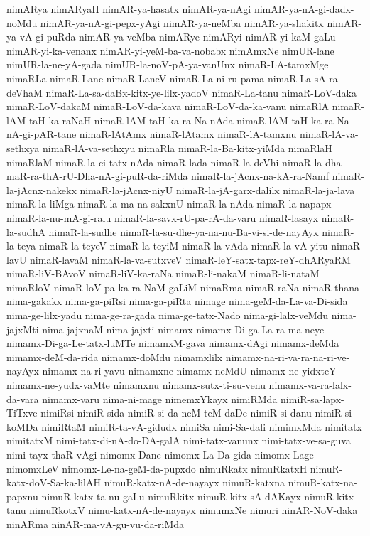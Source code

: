 {nimARya
nimARyaH
nimAR-ya-hasatx
nimAR-ya-nAgi
nimAR-ya-nA-gi-dadx-noMdu
nimAR-ya-nA-gi-pepx-yAgi
nimAR-ya-neMba
nimAR-ya-shakitx
nimAR-ya-vA-gi-puRda
nimAR-ya-veMba
nimARye
nimARyi
nimAR-yi-kaM-gaLu
nimAR-yi-ka-venanx
nimAR-yi-yeM-ba-va-nobabx
nimAmxNe
nimUR-lane
nimUR-la-ne-yA-gada
nimUR-la-noV-pA-ya-vanUnx
nimaR-LA-tamxMge
nimaRLa
nimaR-Lane
nimaR-LaneV
nimaR-La-ni-ru-pama
nimaR-La-sA-ra-deVhaM
nimaR-La-sa-daBx-kitx-ye-lilx-yadoV
nimaR-La-tanu
nimaR-LoV-daka
nimaR-LoV-dakaM
nimaR-LoV-da-kava
nimaR-LoV-da-ka-vanu
nimaRlA
nimaR-lAM-taH-ka-raNaH
nimaR-lAM-taH-ka-ra-Na-nAda
nimaR-lAM-taH-ka-ra-Na-nA-gi-pAR-tane
nimaR-lAtAmx
nimaR-lAtamx
nimaR-lA-tamxnu
nimaR-lA-va-sethxya
nimaR-lA-va-sethxyu
nimaRla
nimaR-la-Ba-kitx-yiMda
nimaRlaH
nimaRlaM
nimaR-la-ci-tatx-nAda
nimaR-lada
nimaR-la-deVhi
nimaR-la-dha-maR-ra-thA-rU-Dha-nA-gi-puR-da-riMda
nimaR-la-jAcnx-na-kA-ra-Namf
nimaR-la-jAcnx-nakekx
nimaR-la-jAcnx-niyU
nimaR-la-jA-garx-dalilx
nimaR-la-ja-lava
nimaR-la-liMga
nimaR-la-ma-na-sakxnU
nimaR-la-nAda
nimaR-la-napapx
nimaR-la-nu-mA-gi-ralu
nimaR-la-savx-rU-pa-rA-da-varu
nimaR-lasayx
nimaR-la-sudhA
nimaR-la-sudhe
nimaR-la-su-dhe-ya-na-nu-Ba-vi-si-de-nayAyx
nimaR-la-teya
nimaR-la-teyeV
nimaR-la-teyiM
nimaR-la-vAda
nimaR-la-vA-yitu
nimaR-lavU
nimaR-lavaM
nimaR-la-va-sutxveV
nimaR-leY-satx-tapx-reY-dhARyaRM
nimaR-liV-BAvoV
nimaR-liV-ka-raNa
nimaR-li-nakaM
nimaR-li-nataM
nimaRloV
nimaR-loV-pa-ka-ra-NaM-gaLiM
nimaRma
nimaR-raNa
nimaR-thana
nima-gakakx
nima-ga-piRsi
nima-ga-piRta
nimage
nima-geM-da-La-va-Di-sida
nima-ge-lilx-yadu
nima-ge-ra-gada
nima-ge-tatx-Nado
nima-gi-lalx-veMdu
nima-jajxMti
nima-jajxnaM
nima-jajxti
nimamx
nimamx-Di-ga-La-ra-ma-neye
nimamx-Di-ga-Le-tatx-luMTe
nimamxM-gava
nimamx-dAgi
nimamx-deMda
nimamx-deM-da-rida
nimamx-doMdu
nimamxlilx
nimamx-na-ri-va-ra-na-ri-ve-nayAyx
nimamx-na-ri-yavu
nimamxne
nimamx-neMdU
nimamx-ne-yidxteY
nimamx-ne-yudx-vaMte
nimamxnu
nimamx-sutx-ti-su-venu
nimamx-va-ra-lalx-da-vara
nimamx-varu
nima-ni-mage
nimemxYkayx
nimiRMda
nimiR-sa-lapx-TiTxve
nimiRsi
nimiR-sida
nimiR-si-da-neM-teM-daDe
nimiR-si-danu
nimiR-si-koMDa
nimiRtaM
nimiR-ta-vA-gidudx
nimiSa
nimi-Sa-dali
nimimxMda
nimitatx
nimitatxM
nimi-tatx-di-nA-do-DA-galA
nimi-tatx-vanunx
nimi-tatx-ve-sa-guva
nimi-tayx-thaR-vAgi
nimomx-Dane
nimomx-La-Da-gida
nimomx-Lage
nimomxLeV
nimomx-Le-na-geM-da-pupxdo
nimuRkatx
nimuRkatxH
nimuR-katx-doV-Sa-ka-lilAH
nimuR-katx-nA-de-nayayx
nimuR-katxna
nimuR-katx-na-papxnu
nimuR-katx-ta-nu-gaLu
nimuRkitx
nimuR-kitx-sA-dAKayx
nimuR-kitx-tanu
nimuRkotxV
nimu-katx-nA-de-nayayx
nimumxNe
nimuri
ninAR-NoV-daka
ninARma
ninAR-ma-vA-gu-vu-da-riMda
}
